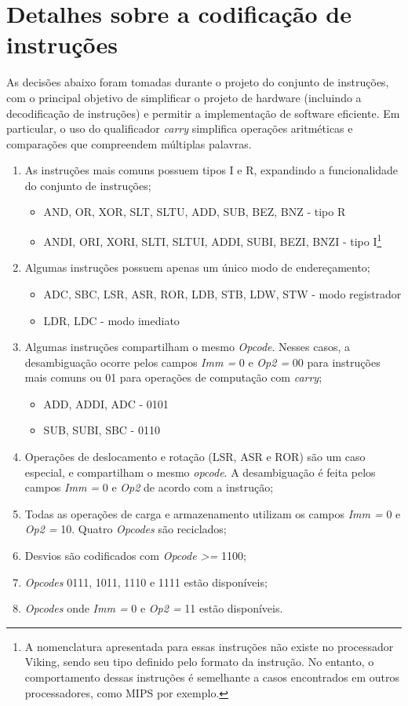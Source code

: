 \documentclass{extreport}
\begin{document}
\section{Detalhes sobre a codificação de instruções}

As decisões abaixo foram tomadas durante o projeto do conjunto de instruções, com o principal objetivo de simplificar o projeto de hardware (incluindo a decodificação de instruções) e permitir a implementação de software eficiente. Em particular, o uso do qualificador \textit{carry} simplifica operações aritméticas e comparações que compreendem múltiplas palavras.

\begin{enumerate}
\item {As instruções mais comuns possuem tipos I e R, expandindo a funcionalidade do conjunto de instruções;
	\begin{itemize}
	\item AND, OR, XOR, SLT, SLTU, ADD, SUB, BEZ, BNZ - tipo R
	\item ANDI, ORI, XORI, SLTI, SLTUI, ADDI, SUBI, BEZI, BNZI - tipo I\footnote{A nomenclatura apresentada para essas instruções não existe no processador Viking, sendo seu tipo definido pelo formato da instrução. No entanto, o comportamento dessas instruções é semelhante a casos encontrados em outros processadores, como MIPS por exemplo.}
	\end{itemize}
}
\item {Algumas instruções possuem apenas um único modo de endereçamento;
	\begin{itemize}
	\item ADC, SBC, LSR, ASR, ROR, LDB, STB, LDW, STW - modo registrador
	\item LDR, LDC - modo imediato
	\end{itemize}
}
\item {Algumas instruções compartilham o mesmo \textit{Opcode}. Nesses casos, a desambiguação ocorre pelos campos \textit{Imm = } 0 e \textit{Op2 = } 00 para instruções mais comuns ou 01 para operações de computação com \textit{carry};
	\begin{itemize}
	\item ADD, ADDI, ADC - 0101
	\item SUB, SUBI, SBC - 0110
	\end{itemize}
}
\item Operações de deslocamento e rotação (LSR, ASR e ROR) são um caso especial, e compartilham o mesmo \textit{opcode}. A desambiguação é feita pelos campos \textit{Imm = } 0 e \textit{Op2} de acordo com a instrução;
\item Todas as operações de carga e armazenamento utilizam os campos \textit{Imm = } 0 e \textit{Op2 = }10. Quatro \textit{Opcodes} são reciclados;
\item Desvios são codificados com \textit{Opcode >=} 1100;
\item \textit{Opcodes} 0111, 1011, 1110 e 1111 estão disponíveis;
\item \textit{Opcodes} onde \textit{Imm = }0 e \textit{Op2 = } 11 estão disponíveis.
\end{enumerate}
\end{document}
